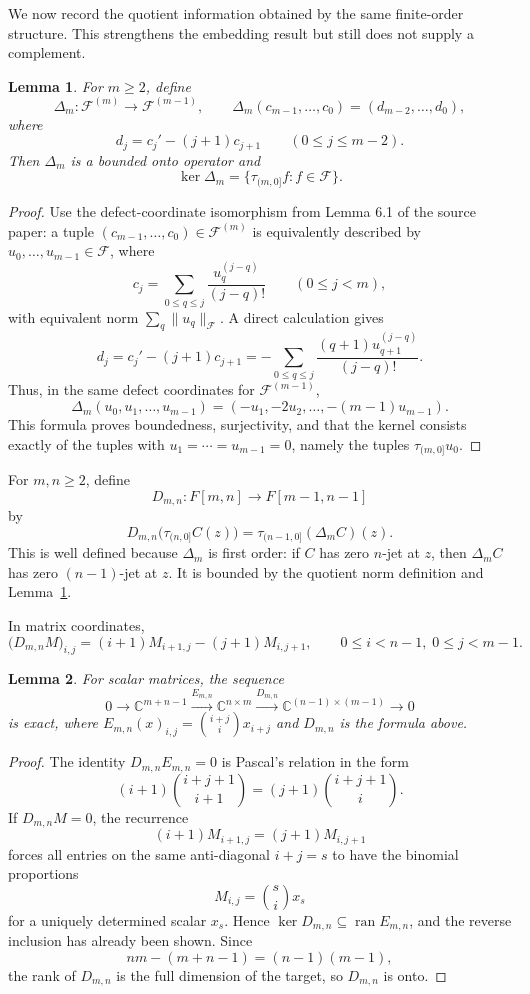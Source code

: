 \documentclass[11pt]{article}
\newtheorem{lemma}{Lemma}
\newcommand{\F}{\mathscr F}
\newcommand{\To}{\longrightarrow}
\begin{document}
We now record the quotient information obtained by the same finite-order structure.  This strengthens the embedding result but still does not supply a complement.

\begin{lemma}\label{lem:defect}
For \(m\ge2\), define
\[
  \Delta_m:\F^{(m)}\To\F^{(m-1)},\qquad
  \Delta_m(c_{m-1},\ldots,c_0)=(d_{m-2},\ldots,d_0),
\]
where
\[
  d_j=c_j'-(j+1)c_{j+1}\qquad (0\le j\le m-2).
\]
Then \(\Delta_m\) is a bounded onto operator and
\[
  \ker \Delta_m=\{\tau_{(m,0]}f:f\in\F\}.
\]
\end{lemma}

\begin{proof}
Use the defect-coordinate isomorphism from Lemma 6.1 of the source paper: a tuple
\((c_{m-1},\ldots,c_0)\in\F^{(m)}\) is equivalently described by \(u_0,\ldots,u_{m-1}\in\F\), where
\[
  c_j=\sum_{0\le q\le j}\frac{u_q^{(j-q)}}{(j-q)!}\qquad(0\le j<m),
\]
with equivalent norm \(\sum_q\|u_q\|_\F\).  A direct calculation gives
\[
  d_j=c_j'-(j+1)c_{j+1}
     =-\sum_{0\le q\le j}\frac{(q+1)u_{q+1}^{(j-q)}}{(j-q)!}.
\]
Thus, in the same defect coordinates for \(\F^{(m-1)}\),
\[
  \Delta_m(u_0,u_1,\ldots,u_{m-1})
   =(-u_1,-2u_2,\ldots,-(m-1)u_{m-1}).
\]
This formula proves boundedness, surjectivity, and that the kernel consists exactly of the tuples with \(u_1=\cdots=u_{m-1}=0\), namely the tuples \(\tau_{(m,0]}u_0\).
\end{proof}

For \(m,n\ge2\), define
\[
  D_{m,n}:F[m,n]\To F[m-1,n-1]
\]
by
\[
  D_{m,n}\big(\tau_{(n,0]}C(z)\big)
  =\tau_{(n-1,0]}(\Delta_m C)(z).
\]
This is well defined because \(\Delta_m\) is first order: if \(C\) has zero \(n\)-jet at \(z\), then \(\Delta_m C\) has zero \((n-1)\)-jet at \(z\).  It is bounded by the quotient norm definition and Lemma~\ref{lem:defect}.

In matrix coordinates,
\[
  \big(D_{m,n}M\big)_{i,j}
  =(i+1)M_{i+1,j}-(j+1)M_{i,j+1},
  \qquad 0\le i<n-1,\;0\le j<m-1.
\]

\begin{lemma}\label{lem:finite}
For scalar matrices, the sequence
\[
0\To \mathbb C^{m+n-1}
\xrightarrow{E_{m,n}}
\mathbb C^{n\times m}
\xrightarrow{D_{m,n}}
\mathbb C^{(n-1)\times(m-1)}
\To0
\]
is exact, where \(E_{m,n}(x)_{i,j}=\binom{i+j}{i}x_{i+j}\) and \(D_{m,n}\) is the formula above.
\end{lemma}

\begin{proof}
The identity \(D_{m,n}E_{m,n}=0\) is Pascal's relation in the form
\[
  (i+1)\binom{i+j+1}{i+1}=(j+1)\binom{i+j+1}{i}.
\]
If \(D_{m,n}M=0\), the recurrence
\[
  (i+1)M_{i+1,j}=(j+1)M_{i,j+1}
\]
forces all entries on the same anti-diagonal \(i+j=s\) to have the binomial proportions
\[
  M_{i,j}=\binom{s}{i}x_s
\]
for a uniquely determined scalar \(x_s\).  Hence \(\ker D_{m,n}\subseteq \operatorname{ran}E_{m,n}\), and the reverse inclusion has already been shown.  Since
\[
  nm-(m+n-1)=(n-1)(m-1),
\]
the rank of \(D_{m,n}\) is the full dimension of the target, so \(D_{m,n}\) is onto.
\end{proof}
\end{document}
